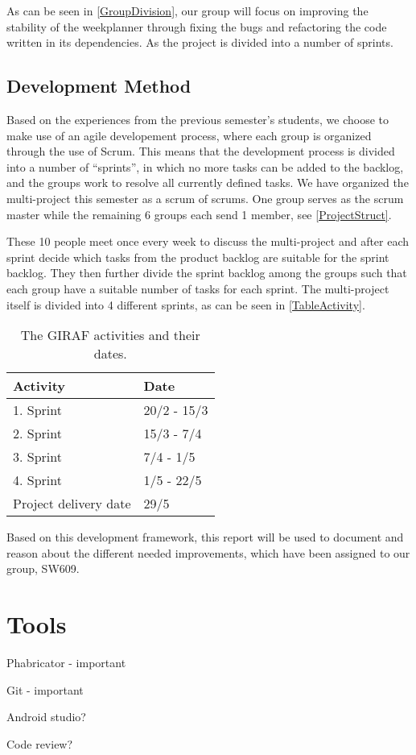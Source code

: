 As can be seen in \autoref{GroupDivision}, our group will focus
on improving the stability of the weekplanner through fixing the
bugs and refactoring the code written in its dependencies. As the project
is divided into a number of sprints.

\subsection{Development Method}

Based on the experiences from the previous semester's students, we choose to
make use of an agile developement process, where each group is organized through
the use of Scrum. This means that the development process is divided into a
number of ``sprints'', in which no more tasks can be added to the backlog, and
the groups work to resolve all currently defined tasks. We have organized the
multi-project this semester as a scrum of scrums. One group serves as the scrum
master while the remaining 6 groups each send 1 member, see
\autoref{ProjectStruct}.


These 10 people meet once every week to discuss the multi-project and after each
sprint decide which tasks from the product backlog are suitable for the sprint
backlog. They then further divide the sprint backlog among the groups such that
each group have a suitable number of tasks for each sprint. The multi-project
itself is divided into 4 different sprints, as can be seen in
\autoref{TableActivity}. 

\begin{table}[H]
\centering
\begin{tabular}{|l|l|}
\hline
Activity & Date \\ \hline
1. Sprint & 20/2 - 15/3 \\\hline 
2. Sprint & 15/3 - 7/4\\\hline 
3. Sprint & 7/4 - 1/5\\\hline 
4. Sprint & 1/5 - 22/5\\\hline 
Project delivery date & 29/5\\\hline
\end{tabular}
\caption{The GIRAF activities and their dates.}
\label{TableActivity}
\end{table}

Based on this development framework, this report will be used to document and
reason about the different needed improvements, which have been assigned to our
group, SW609.


\section{Tools}

Phabricator - important

Git - important

Android studio?

Code review?
